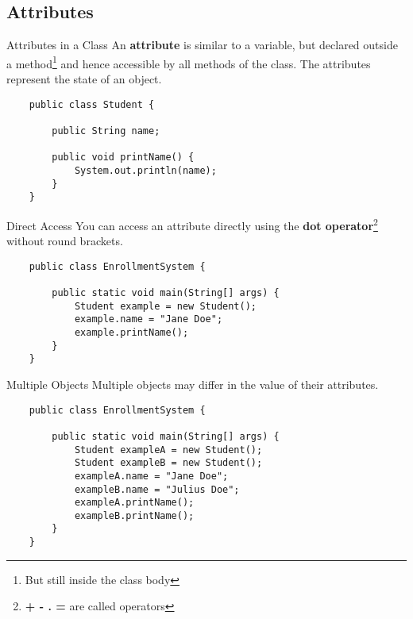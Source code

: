 \subsection{Attributes}
\begin{frame}[fragile]{Attributes in a Class}
	An \textbf{attribute} is similar to a variable, but declared outside a method\footnote{But still inside the class body} 
	and hence accessible by all methods of the class.
	The attributes represent the state of an object.
	\begin{lstlisting}
	public class Student {
	
	    public String name;
	    
	    public void printName() {
	        System.out.println(name);
	    }
	}
	\end{lstlisting}
\end{frame}

\begin{frame}[fragile]{Direct Access}
	You can access an attribute directly using the \textbf{dot operator}\footnote{\textbf{+ - . =} are called operators} without round brackets.
	\begin{lstlisting}
	public class EnrollmentSystem {
	    
	    public static void main(String[] args) {
	        Student example = new Student();
	        example.name = "Jane Doe";
	        example.printName();
	    }
	}
	\end{lstlisting}
\end{frame}

\begin{frame}[fragile]{Multiple Objects}
	Multiple objects may differ in the value of their attributes.
	\begin{lstlisting}
	public class EnrollmentSystem {
	    
	    public static void main(String[] args) {
	        Student exampleA = new Student();
	        Student exampleB = new Student();
	        exampleA.name = "Jane Doe";
	        exampleB.name = "Julius Doe";
	        exampleA.printName();
	        exampleB.printName();
	    }
	}
	\end{lstlisting}
\end{frame}

